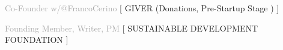 



\begin{twenty} 
% 
    {\textcolor{darkgray}%
    {%
    Co-Founder w/@FrancoCerino
    }}%
	{[ 
    {G\scriptsize IVER}
	(Donations, 
	Pre-Startup 
	Stage%
) 
	]}%
	{
	}
% 
        \vspace*{-0.2cm}

    {\textcolor{darkgray}%
    {%
    Founding Member, Writer, %
    PM}}%
	{[ %
	{S\scriptsize USTAINABLE}
	{D\scriptsize EVELOPMENT}
	{F\scriptsize OUNDATION}
	]}%
	{
	}
% 
        \vspace*{-0.2cm}


\end{twenty}
